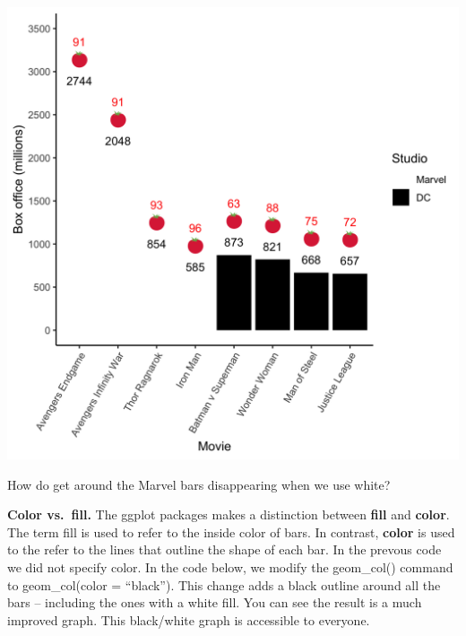 \documentclass[
]{krantz}
\makeatletter
\newenvironment{Shaded}{\begin{snugshade}}{\end{snugshade}}
\newcommand{\DataTypeTok}[1]{\textcolor[rgb]{0.27,0.27,0.27}{#1}}
\newcommand{\DecValTok}[1]{\textcolor[rgb]{0.06,0.06,0.06}{#1}}
\newcommand{\KeywordTok}[1]{\textcolor[rgb]{0.27,0.27,0.27}{\textbf{#1}}}
\newcommand{\NormalTok}[1]{#1}
\newcommand{\OperatorTok}[1]{\textcolor[rgb]{0.43,0.43,0.43}{\textbf{#1}}}
\newcommand{\StringTok}[1]{\textcolor[rgb]{0.5,0.5,0.5}{#1}}
\newenvironment{kframe}{%
\medskip{}
\setlength{\fboxsep}{.8em}
 \def\at@end@of@kframe{}%
 \ifinner\ifhmode%
  \def\at@end@of@kframe{\end{minipage}}%
  \begin{minipage}{\columnwidth}%
 \fi\fi%
 \def\FrameCommand##1{\hskip\@totalleftmargin \hskip-\fboxsep
 \colorbox{shadecolor}{##1}\hskip-\fboxsep
     \hskip-\linewidth \hskip-\@totalleftmargin \hskip\columnwidth}%
 \MakeFramed {\advance\hsize-\width
   \@totalleftmargin\z@ \linewidth\hsize
   \@setminipage}}%
 {\par\unskip\endMakeFramed%
 \at@end@of@kframe}
\renewenvironment{Shaded}{\begin{kframe}}{\end{kframe}}
\makeatother
\begin{document}
\begin{Shaded}
\end{Shaded}

\includegraphics[width=0.85\linewidth]{ch_graphing/images/emoji_graph2}

\newpage

How do get around the Marvel bars disappearing when we use white?

\textbf{Color vs.~fill.} The ggplot packages makes a distinction between \textbf{fill} and \textbf{color}. The term fill is used to refer to the inside color of bars. In contrast, \textbf{color} is used to the refer to the lines that outline the shape of each bar. In the prevous code we did not specify color. In the code below, we modify the geom\_col() command to geom\_col(color = ``black''). This change adds a black outline around all the bars -- including the ones with a white fill. You can see the result is a much improved graph. This black/white graph is accessible to everyone.
\end{document}
